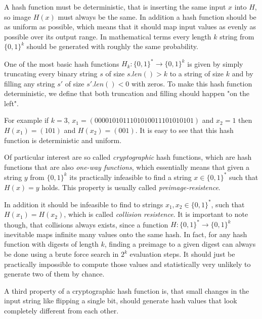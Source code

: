 A hash function must be deterministic, that is inserting the same input $x$ into $H$, so image $H(x)$ must always be the same. In addition a hash function should be as uniform as possible, which means that it should map input values as evenly as possible over its output range. In mathematical terms every length $k$ string from $\{0,1\}^k$ should be generated with roughly the same probability.  
\begin{example} One of the most basic hash functions 
$H_k:\{0,1\}^*\to \{0,1\}^k$ is given by simply truncating every binary string $s$ of size $s.len()> k$ to a string of size $k$ and by filling any string $s'$ of size $s'.len()<0$ with zeros. To make this hash function deterministic, we define that both truncation and filling should happen "on the left".

For example if $k=3$, $x_1=(0000101011101010011101010101)$ and $x_2=1$ then $H(x_1)=(101)$ and $H(x_2)=(001)$. It is easy to see that this hash function is deterministic and uniform.
\end{example}
Of particular interest are so called \textit{cryptographic} hash functions, which are hash functions that are also \textit{one-way functions}, which essentially means that given a string $y$ from $\{0,1\}^k$ its practically infeasible to find a string $x\in\{0,1\}^*$ such that $H(x)=y$ holds. This property is usually called \textit{preimage-resistence}. 

In addition it should be infeasible to find to strings $x_1,x_2 \in\{0,1\}^*$, such that $H(x_1)=H(x_2)$, which is called \textit{collision resistence}. It is important to note though, that collisions always exists, since a function $H: \{0,1\}^* \to \{0,1\}^k$ inevitable maps infinite many values onto the same hash. In fact, for any hash function with digests of length $k$, finding a preimage to a given digest can always be done using a brute force search in $2^k$ evaluation steps. It should just be practically impossible to compute those values and statistically very unlikely to generate two of them by chance. 

A third property of a cryptographic hash function is, that small changes in the input string like flipping a single bit, should generate hash values that look completely different from each other.

